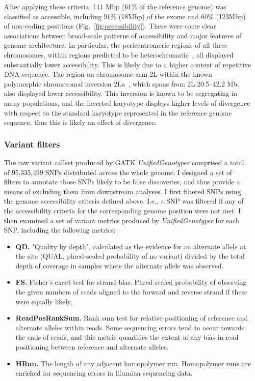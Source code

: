 \documentclass[a4paper,11pt,abstracton,hidelinks]{scrartcl}
\begin{document}
After applying these criteria, 141 Mbp (61\% of the reference genome) was classified as accessible, including 91\% (18Mbp) of the exome and 60\% (123Mbp) of non-coding positions (Fig.~\ref{fig:accessibility}).
%
There were some clear associations between broad-scale patterns of accessibility and major features of genome architecture.
%
In particular, the pericentromeric regions of all three chromosomes, within regions predicted to be heterochromatic~\parencite{Sharakhova2010}, all displayed substantially lower accessibility.
%
This is likely due to a higher content of repetitive DNA sequence.
%
The region on chromosome arm 2L within the known polymorphic chromosomal inversion 2La~\parencite{Coluzzi2002}, which spans from 2L:20.5--42.2 Mb, also displayed lower accessibility.
%
This inversion is known to be segregating in many populations, and the inverted karyotype displays higher levels of divergence with respect to the standard karyotype represented in the reference genome sequence, thus this is likely an effect of divergence.


\subsubsection{Variant filters}


The raw variant callset produced by GATK \textit{UnifiedGenotyper} comprised a total of 95,335,499 SNPs distributed across the whole genome.
%
I designed a set of filters to annotate those SNPs likely to be false discoveries, and thus provide a means of excluding them from downstream analyses.
%
I first filtered SNPs using the genome accessibility criteria defined above.
%
I.e., a SNP was filtered if any of the accessibility criteria for the corresponding genome position were not met.
%
I then examined a set of variant metrics produced by \textit{UnifiedGenotyper} for each SNP, including the following metrics:
%
\begin{itemize}
%
\item \textbf{QD.} "Quality by depth", calculated as the evidence for an alternate allele at the site (QUAL, phred-scaled probability of no variant) divided by the total depth of coverage in samples where the alternate allele was observed.
%
\item \textbf{FS.} Fisher's exact test for strand-bias.
%
Phred-scaled probability of observing the given numbers of reads aligned to the forward and reverse strand if these were equally likely.
%
\item \textbf{ReadPosRankSum.} Rank sum test for relative positioning of reference and alternate alleles within reads.
%
Some sequencing errors tend to occur towards the ends of reads, and this metric quantifies the extent of any bias in read positioning between reference and alternate alleles.
%
\item \textbf{HRun.} The length of any adjacent homopolymer run.
%
Homopolymer runs are enriched for sequencing errors in Illumina sequencing data.
%
\end{itemize}
\end{document}
